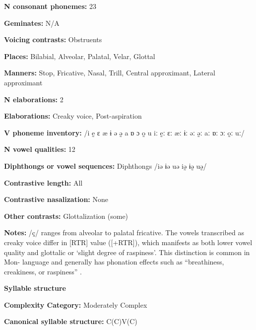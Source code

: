 \textbf{N consonant phonemes:} 23



\textbf{Geminates:} N/A



\textbf{Voicing contrasts:} Obstruents



\textbf{Places:} Bilabial, Alveolar, Palatal, Velar, Glottal



\textbf{Manners:} Stop, Fricative, Nasal, Trill, Central approximant, Lateral approximant



\textbf{N elaborations:} 2



\textbf{Elaborations:} Creaky voice, Post-aspiration



\textbf{V phoneme inventory:} /i ḛ ɛ æ ɨ ə ə̰ a ɒ ɔ o̰ u iː ḛː ɛː æː ɨː əː ə̰ː aː ɒː ɔː o̰ː uː/



\textbf{N vowel qualities:} 12



\textbf{Diphthongs or vowel sequences:} Diphthongs /iə ɨə uə iə̰ ɨə̰ uə̰/



\textbf{Contrastive length:} All



\textbf{Contrastive nasalization:} None



\textbf{Other contrasts:} Glottalization (some)



\textbf{Notes:} /ç/ ranges from alveolar to palatal fricative. The vowels transcribed as creaky voice differ in [RTR] value ([+RTR]), which manifests as both lower vowel quality and glottalic or ‘slight degree of raspiness’. This distinction is common in Mon- language and generally has phonation effects such as “breathiness, creakiness, or raspiness” \citep[14]{Alves2006}.



\textbf{Syllable structure}



\textbf{Complexity Category:} Moderately Complex



\textbf{Canonical syllable structure:} C(C)V(C) \citep[17-21]{Alves2006}



